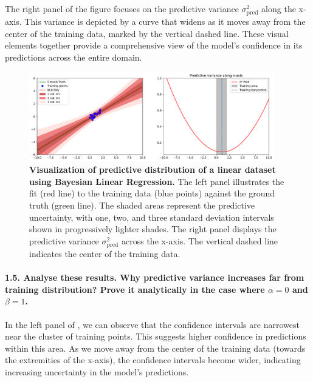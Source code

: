 The right panel of the figure focuses on the predictive variance $ \sigma^2_{\text{pred}}  $ along the x-axis. This variance is depicted by a curve that widens as it moves away from the center of the training data, marked by the vertical dashed line. These visual elements together provide a comprehensive view of the model's confidence in its predictions across the entire domain.
\begin{figure}[H]
    \centering
    \includegraphics[width=0.95\textwidth]{phi_linear.pdf}
    \caption{\textbf{Visualization of predictive distribution of a linear dataset using Bayesian Linear Regression.} The left panel illustrates the fit (red line) to the training data (blue points) against the ground truth (green line). The shaded areas represent the predictive uncertainty, with one, two, and three standard deviation intervals shown in progressively lighter shades. The right panel displays the predictive variance $\sigma^2_{\text{pred}} $ across the x-axis. The vertical dashed line indicates the center of the training data.}
    \label{fig:phi_linear}
\end{figure}

\paragraph*{1.5. Analyse these results. Why predictive variance increases far from training distribution? Prove it analytically in the case where $\alpha=0$ and $\beta=1$.}

In the left panel of , we can observe that the confidence intervals are narrowest near the cluster of training points. This suggests higher confidence in predictions within this area. As we move away from the center of the training data (towards the extremities of the x-axis), the confidence intervals become wider, indicating increasing uncertainty in the model's predictions.

